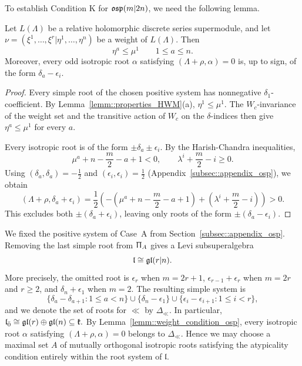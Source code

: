 To establish Condition K for ${\mathfrak{osp}}(m\vert 2n)$, we need the following lemma.

\begin{lemma}
\label{lemm::weight_condition_osp}
Let $L(\Lambda)$ be a relative holomorphic discrete series supermodule, and let
$
\nu=(\xi^{1},\ldots,\xi^{r}\vert \eta^{1},\ldots,\eta^{n})
$ be a weight of $L(\Lambda)$.
Then
\[
\eta^a\leq\mu^1
\qquad 1\leq a\leq n.
\]
Moreover, every odd isotropic root $\alpha$ satisfying
$(\Lambda+\rho,\alpha)=0$ is, up to sign, of the form
$\delta_a-\epsilon_i$.
\end{lemma}

\begin{proof}

Every simple root of the chosen positive system has nonnegative $\delta_1$-coefficient. By Lemma~\ref{lemm::properties_HWM}(a), $\eta^1\leq\mu^1$. The $W_c$-invariance of the weight set and the transitive action of $W_c$ on the $\delta$-indices then give $\eta^a\leq\mu^1$ for every $a$.

Every isotropic root is of the form $\pm\delta_a\pm\epsilon_i$. By the Harish-Chandra inequalities,
\[
\mu^a+n-\frac m2-a+1<0,
\qquad
\lambda^i+\frac m2-i\geq0.
\]
Using $(\delta_a,\delta_a)=-\frac12$ and $(\epsilon_i,\epsilon_i)=\frac12$ (Appendix~\ref{subsec::appendix_osp}), we obtain
\[
(\Lambda+\rho,\delta_a+\epsilon_i)
=
\frac12\left(
-\left(\mu^a+n-\frac m2-a+1\right)
+\left(\lambda^i+\frac m2-i\right)\right)>0.
\]
This excludes both $\pm(\delta_a+\epsilon_i)$, leaving only roots of the form $\pm(\delta_a-\epsilon_i)$.
\end{proof}

We fixed the positive system of Case~A from Section~\ref{subsec::appendix_osp}. Removing the last simple root from $\Uppi_A$ gives a Levi subsuperalgebra
\begin{equation}
\mathfrak l\cong{\mathfrak{gl}}(r\vert n).
\end{equation}
More precisely, the omitted root is $\epsilon_r$ when $m=2r+1$, $\epsilon_{r-1}+\epsilon_r$ when $m=2r$ and $r\geq2$, and $\delta_n+\epsilon_1$ when $m=2$. The resulting simple system is
\begin{equation}
\{\delta_a-\delta_{a+1}:1\leq a<n\}
\cup\{\delta_n-\epsilon_1\}
\cup\{\epsilon_i-\epsilon_{i+1}:1\leq i<r\},
\end{equation}
and we denote the set of roots for $\ll$ by $\Delta_{\ll}$. In particular,
$
\mathfrak l_{\bar0}
\cong{\mathfrak{gl}}(r)\oplus{\mathfrak{gl}}(n)
\subseteq{\mathfrak k}.
$ By Lemma~\ref{lemm::weight_condition_osp}, every isotropic root $\alpha$ satisfying $(\Lambda+\rho,\alpha)=0$ belongs to $\Delta_{\ll}$. Hence we may choose a maximal set $A$ of mutually orthogonal isotropic roots satisfying the atypicality condition entirely within the root system of $\mathfrak l$.



